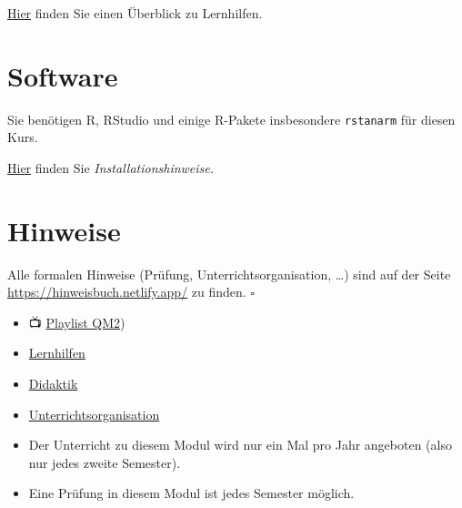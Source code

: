 \documentclass[
  ngerman,
  letterpaper,
]{scrbook}
\begin{document}
\href{https://hinweisbuch.netlify.app/160-hinweise-lernhilfen-frame}{Hier}
finden Sie einen Überblick zu Lernhilfen.

\section{Software}\label{software}

Sie benötigen R, RStudio und einige R-Pakete insbesondere
\texttt{rstanarm} für diesen Kurs.

\href{https://hinweisbuch.netlify.app/130-hinweise-software}{Hier}
finden Sie \emph{Installationshinweise.}

\section{Hinweise}\label{hinweise}

\begin{tcolorbox}[enhanced jigsaw, opacitybacktitle=0.6, breakable, titlerule=0mm, colbacktitle=quarto-callout-note-color!10!white, rightrule=.15mm, toptitle=1mm, opacityback=0, bottomtitle=1mm, title=\textcolor{quarto-callout-note-color}{\faInfo}\hspace{0.5em}{Hinweis}, arc=.35mm, coltitle=black, bottomrule=.15mm, colframe=quarto-callout-note-color-frame, left=2mm, leftrule=.75mm, toprule=.15mm, colback=white]

Alle formalen Hinweise (Prüfung, Unterrichtsorganisation, \ldots) sind
auf der Seite \url{https://hinweisbuch.netlify.app/} zu finden.
\(\square\)

\end{tcolorbox}

\begin{itemize}
\item
  📺
  \href{https://www.youtube.com/watch?v=QNMVi6IqQ90&list=PLRR4REmBgpIGgz2Oe2Z9FcoLYBDnaWatN}{Playlist
  QM2})
\item
  \href{https://hinweisbuch.netlify.app/160-hinweise-lernhilfen-frame}{Lernhilfen}
\item
  \href{https://hinweisbuch.netlify.app/110-hinweise-didaktik-frame}{Didaktik}
\item
  \href{https://hinweisbuch.netlify.app/120-hinweise-unterricht-frame}{Unterrichtsorganisation}
\item
  Der Unterricht zu diesem Modul wird nur ein Mal pro Jahr angeboten
  (also nur jedes zweite Semester).
\item
  Eine Prüfung in diesem Modul ist jedes Semester möglich.
\end{itemize}
\end{document}
